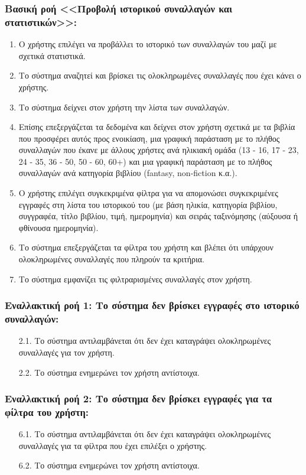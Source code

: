 \documentclass[12pt,a4paper]{article}
\begin{document}
\subsubsection*{Βασική ροή <<Προβολή ιστορικού συναλλαγών και στατιστικών>>:}
\begin{enumerate}
    \item Ο χρήστης επιλέγει να προβάλλει το ιστορικό των συναλλαγών του μαζί με σχετικά στατιστικά.
    \item Το σύστημα αναζητεί και βρίσκει τις ολοκληρωμένες συναλλαγές που έχει κάνει ο χρήστης.
    \item Το σύστημα δείχνει στον χρήστη την λίστα των συναλλαγών.
    \item Επίσης επεξεργάζεται τα δεδομένα και δείχνει στον χρήστη σχετικά με τα βιβλία που προσφέρει αυτός προς ενοικίαση, μια γραφική παράσταση με το πλήθος συναλλαγών που έκανε με άλλους χρήστες ανά ηλικιακή ομάδα (13 - 16, 17 - 23, 24 - 35, 36 - 50, 50 - 60, 60+) και μια γραφική παράσταση με το πλήθος συναλλαγών ανά κατηγορία βιβλίου (fantasy, non-fiction κ.α.).
    \item Ο χρήστης επιλέγει συγκεκριμένα φίλτρα για να απομονώσει συγκεκριμένες εγγραφές στη λίστα του ιστορικού του (με βάση ηλικία, κατηγορία βιβλίου, συγγραφέα, τίτλο βιβλίου, τιμή, ημερομηνία) και σειράς ταξινόμησης (αύξουσα ή φθίνουσα ημερομηνία).
    \item Το σύστημα επεξεργάζεται τα φίλτρα του χρήστη και βλέπει ότι υπάρχουν ολοκληρωμένες συναλλαγές που πληρούν τα κριτήρια.
    \item Το σύστημα εμφανίζει τις φιλτραρισμένες συναλλαγές στον χρήστη.
\end{enumerate}

\subsubsection*{Εναλλακτική ροή 1: Το σύστημα δεν βρίσκει εγγραφές στο ιστορικό συναλλαγών:}
\begin{enumerate}
    \item [2.1.] Το σύστημα αντιλαμβάνεται ότι δεν έχει καταγράψει ολοκληρωμένες συναλλαγές για τον χρήστη.
    \item [2.2.] Το σύστημα ενημερώνει τον χρήστη αντίστοιχα.
\end{enumerate}

\subsubsection*{Εναλλακτική ροή 2: Το σύστημα δεν βρίσκει εγγραφές για τα φίλτρα του χρήστη:}
\begin{enumerate}
    \item [6.1.] Το σύστημα αντιλαμβάνεται ότι δεν έχει καταγράψει ολοκληρωμένες συναλλαγές για τα φίλτρα που έχει επιλέξει ο χρήστης.
    \item [6.2.] Το σύστημα ενημερώνει τον χρήστη αντίστοιχα.
\end{enumerate}
\end{document}
